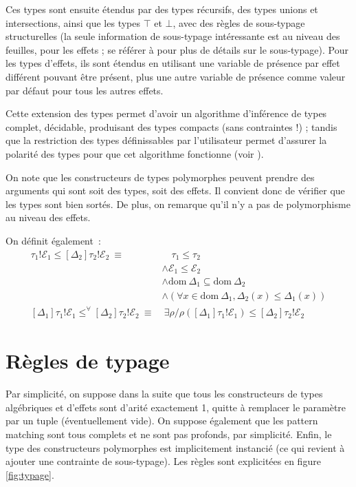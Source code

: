 \documentclass[a4paper,10pt]{article}
\begin{document}
Ces types sont ensuite étendus par des types récursifs, des types unions et intersections, ainsi que les types $\top$ et $\bot$, avec des règles de sous-typage structurelles (la seule information de sous-typage intéressante est au niveau des feuilles, pour les effets ; se référer à \cite{dolan2017algebraic} pour plus de détails sur le sous-typage). Pour les types d'effets, ils sont étendus en utilisant une variable de présence par effet différent pouvant être présent, plus une autre variable de présence comme valeur par défaut pour tous les autres effets.

Cette extension des types permet d'avoir un algorithme d'inférence de types complet, décidable, produisant des types compacts (sans contraintes !) ; tandis que la restriction des types définissables par l'utilisateur permet d'assurer la polarité des types pour que cet algorithme fonctionne (voir \cite{dolan2017algebraic}).

On note que les constructeurs de types polymorphes peuvent prendre des arguments qui sont soit des types, soit des effets. Il convient donc de vérifier que les types sont bien sortés. De plus, on remarque qu'il n'y a pas de polymorphisme au niveau des effets.

On définit également~:
\begin{align*}
[\Delta_1]\tau_1!\mathcal{E}_1 \leqslant [\Delta_2]\tau_2!\mathcal{E}_2 ~\equiv&\quad \tau_1 \leqslant \tau_2 \\&\wedge \mathcal{E}_1 \leqslant \mathcal{E}_2 \\&\wedge \mathrm{dom}~\Delta_1 \subseteq \mathrm{dom}~\Delta_2 \\&\wedge (\forall x \in \mathrm{dom}~\Delta_1, \Delta_2(x) \leqslant \Delta_1(x)) \\
[\Delta_1]\tau_1!\mathcal{E}_1 \leqslant^\forall [\Delta_2]\tau_2!\mathcal{E}_2~\equiv&~\exists \rho / \rho([\Delta_1]\tau_1!\mathcal{E}_1) \leqslant [\Delta_2]\tau_2!\mathcal{E}_2
\end{align*}

\section{Règles de typage}

Par simplicité, on suppose dans la suite que tous les constructeurs de types algébriques et d'effets sont d'arité exactement 1, quitte à remplacer le paramètre par un tuple (éventuellement vide). On suppose également que les pattern matching sont tous complets et ne sont pas profonds, par simplicité. Enfin, le type des constructeurs polymorphes est implicitement instancié (ce qui revient à ajouter une contrainte de sous-typage). Les règles sont explicitées en figure \ref{fig:typage}.
\end{document}
